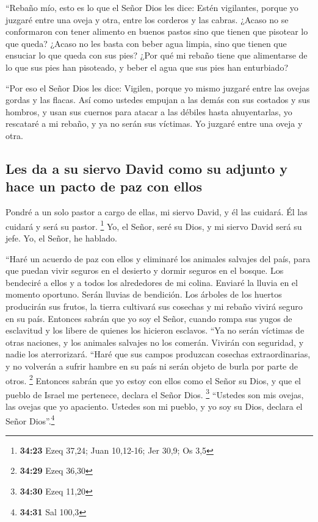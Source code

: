  ``Rebaño mío, esto es lo que el Señor Dios les dice:
Estén vigilantes, porque yo juzgaré entre una oveja y otra, entre los
corderos y las cabras.  ¿Acaso no se conformaron con
tener alimento en buenos pastos sino que tienen que pisotear lo que
queda? ¿Acaso no les basta con beber agua limpia, sino que tienen que
ensuciar lo que queda con sus pies?  ¿Por qué mi rebaño
tiene que alimentarse de lo que sus pies han pisoteado, y beber el agua
que sus pies han enturbiado?

 ``Por eso el Señor Dios les dice: Vigilen, porque yo
mismo juzgaré entre las ovejas gordas y las flacas.  Así
como ustedes empujan a las demás con sus costados y sus hombros, y usan
sus cuernos para atacar a las débiles hasta ahuyentarlas,
 yo rescataré a mi rebaño, y ya no serán sus víctimas. Yo
juzgaré entre una oveja y otra.

\hypertarget{les-da-a-su-siervo-david-como-su-adjunto-y-hace-un-pacto-de-paz-con-ellos}{%
\subsection{Les da a su siervo David como su adjunto y hace un pacto de
paz con
ellos}\label{les-da-a-su-siervo-david-como-su-adjunto-y-hace-un-pacto-de-paz-con-ellos}}

 Pondré a un solo pastor a cargo de ellas, mi siervo
David, y él las cuidará. Él las cuidará y será su pastor. \footnote{\textbf{34:23}
  Ezeq 37,24; Juan 10,12-16; Jer 30,9; Os 3,5}  Yo, el
Señor, seré su Dios, y mi siervo David será su jefe. Yo, el Señor, he
hablado.

 ``Haré un acuerdo de paz con ellos y eliminaré los
animales salvajes del país, para que puedan vivir seguros en el desierto
y dormir seguros en el bosque.  Los bendeciré a ellos y a
todos los alrededores de mi colina. Enviaré la lluvia en el momento
oportuno. Serán lluvias de bendición.  Los árboles de los
huertos producirán sus frutos, la tierra cultivará sus cosechas y mi
rebaño vivirá seguro en su país. Entonces sabrán que yo soy el Señor,
cuando rompa sus yugos de esclavitud y los libere de quienes los
hicieron esclavos.  ``Ya no serán víctimas de otras
naciones, y los animales salvajes no los comerán. Vivirán con seguridad,
y nadie los aterrorizará.  ``Haré que sus campos
produzcan cosechas extraordinarias, y no volverán a sufrir hambre en su
país ni serán objeto de burla por parte de otros. \footnote{\textbf{34:29}
  Ezeq 36,30}  Entonces sabrán que yo estoy con ellos
como el Señor su Dios, y que el pueblo de Israel me pertenece, declara
el Señor Dios. \footnote{\textbf{34:30} Ezeq 11,20} 
``Ustedes son mis ovejas, las ovejas que yo apaciento. Ustedes son mi
pueblo, y yo soy su Dios, declara el Señor Dios''.\footnote{\textbf{34:31}
  Sal 100,3}

